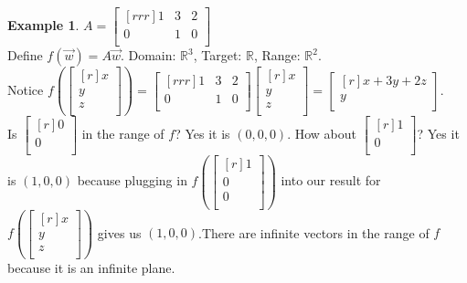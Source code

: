 \documentclass{report}
\theoremstyle{plain}
\theoremstyle{definition}
\newtheorem*{ex}{Example}
\theoremstyle{plain}
\begin{document}
\begin{ex}
$A = \begin{bmatrix}[rrr] 1&3&2\\0&1&0\\ \end{bmatrix}$\\
Define $f(\vec{w}) = A\vec{w}$. Domain: $\mathbb{R}^3$, Target: $\mathbb{R}$, Range: $\mathbb{R}^2$.\\

Notice $f(\begin{bmatrix}[r]x\\y\\z\\ \end{bmatrix}) = \begin{bmatrix}[rrr]1&3&2\\0&1&0\\ \end{bmatrix}\begin{bmatrix}[r]x\\y\\z\\ \end{bmatrix} = \begin{bmatrix}[r]x+3y+2z\\y\\ \end{bmatrix}$.\\
Is $\begin{bmatrix}[r]0\\0\\\end{bmatrix}$ in the range of $f$? Yes it is $(0,0,0)$. How about $\begin{bmatrix}[r]1\\0\\\end{bmatrix}$? Yes it is $(1,0,0)$ because plugging in $f(\begin{bmatrix}[r]1\\0\\0\\\end{bmatrix})$ into our result for $f(\begin{bmatrix}[r]x\\y\\z\\\end{bmatrix})$ gives us $(1,0,0)$.There are infinite vectors in the range of $f$ because it is an infinite plane. 
\end{ex}
\end{document}
